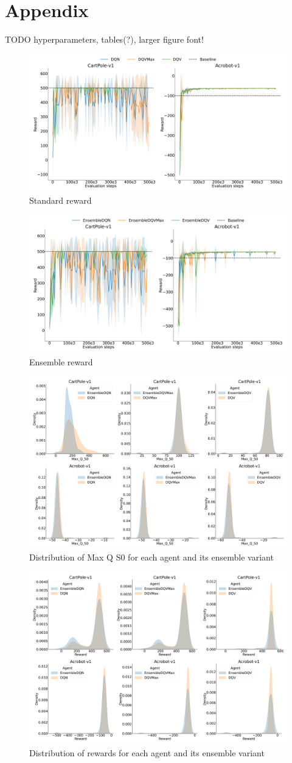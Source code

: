 \section{Appendix}\label{sec:appendix}
TODO hyperparameters, tables(?), larger figure font!

\begin{figure}[!tbp]
  \centering
  \includegraphics[width=.5\textwidth]{img/dshift_plots_rwd.png}
  \caption{Standard reward}\label{fig:dshift_rwd}
\end{figure}

\begin{figure}[!tbp]
  \centering
  \includegraphics[width=.5\textwidth]{img/dshift_plots_ensembles_rwd.png}
  \caption{Ensemble reward}\label{fig:dshift_ensemble_rwd}
\end{figure}

\begin{figure}[!tbp]
  \centering
  \includegraphics[width=.5\textwidth]{img/all_qv_dist.png}
  \caption{Distribution of Max Q S0 for each agent and its ensemble
    variant}\label{fig:qv_dist}
\end{figure}

\begin{figure}[!tbp]
  \centering
  \includegraphics[width=.5\textwidth]{img/all_rwd_dist.png}
  \caption{Distribution of rewards for each agent and its ensemble
    variant}\label{fig:rwd_dist}
\end{figure}